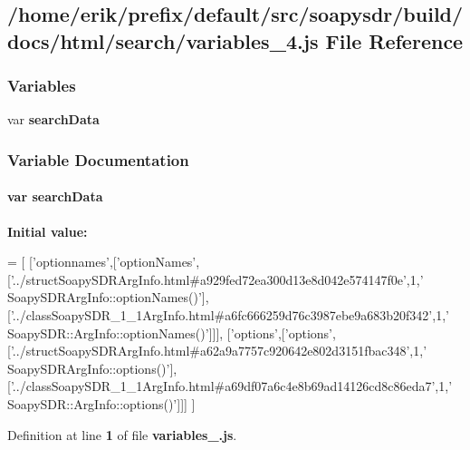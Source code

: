 \subsection{/home/erik/prefix/default/src/soapysdr/build/docs/html/search/variables\+\_\+4.js File Reference}
\label{variables__4_8js}
\subsubsection*{Variables}
\begin{DoxyCompactItemize}
\item 
var {\bf search\+Data}
\end{DoxyCompactItemize}


\subsubsection{Variable Documentation}
\paragraph[{search\+Data}]{\setlength{\rightskip}{0pt plus 5cm}var search\+Data}\label{variables__4_8js_ad01a7523f103d6242ef9b0451861231e}
{\bfseries Initial value\+:}
\begin{DoxyCode}
=
[
  [\textcolor{stringliteral}{'optionnames'},[\textcolor{stringliteral}{'optionNames'},[\textcolor{stringliteral}{'../structSoapySDRArgInfo.html#a929fed72ea300d13e8d042e574147f0e'},1,\textcolor{stringliteral}{'
      SoapySDRArgInfo::optionNames()'}],[\textcolor{stringliteral}{'../classSoapySDR\_1\_1ArgInfo.html#a6fc666259d76c3987ebe9a683b20f342'},1,\textcolor{stringliteral}{'
      SoapySDR::ArgInfo::optionNames()'}]]],
  [\textcolor{stringliteral}{'options'},[\textcolor{stringliteral}{'options'},[\textcolor{stringliteral}{'../structSoapySDRArgInfo.html#a62a9a7757c920642e802d3151fbac348'},1,\textcolor{stringliteral}{'
      SoapySDRArgInfo::options()'}],[\textcolor{stringliteral}{'../classSoapySDR\_1\_1ArgInfo.html#a69df07a6c4e8b69ad14126cd8c86eda7'},1,\textcolor{stringliteral}{'
      SoapySDR::ArgInfo::options()'}]]]
]
\end{DoxyCode}


Definition at line {\bf 1} of file {\bf variables\+\_.\+js}.

